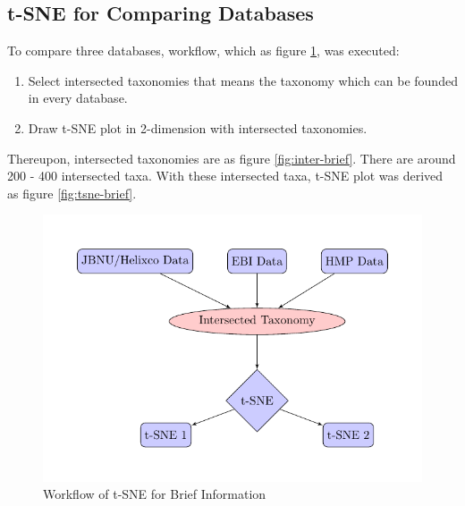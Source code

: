 \documentclass[a4paper]{article}
\begin{document}
        \subsection{t-SNE for Comparing Databases}
            To compare three databases, workflow, which as figure \ref{fig:workflow-brief}, was executed:
            \begin{enumerate}
                \item Select intersected taxonomies that means the taxonomy which can be founded in every database.
                \item Draw t-SNE plot in 2-dimension with intersected taxonomies.
            \end{enumerate}

            Thereupon, intersected taxonomies are as figure \ref{fig:inter-brief}. There are around 200 - 400 intersected taxa. With these intersected taxa, t-SNE plot was derived as figure \ref{fig:tsne-brief}.

            \begin{figure}[p]
                \centering
                \includegraphics[width=0.3 \linewidth]{figures/tikz/brief.pdf}
                \caption{Workflow of t-SNE for Brief Information}
                \label{fig:workflow-brief}
            \end{figure}
\end{document}
